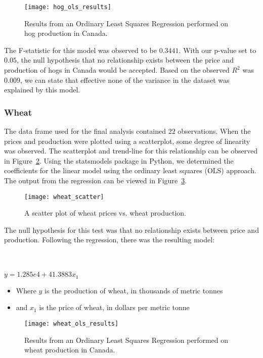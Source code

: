 \begin{figure}
    \texttt{[image: hog\_ols\_results]}
    \caption{Results from an Ordinary Least Squares Regression performed on hog production in Canada.}
    \label{fig:hog_ols}
\end{figure}


The F-statistic for this model was observed to be $0.3441$.
With our p-value set to $0.05$, the null hypothesis that no relationship exists between the price and production of hogs in Canada would be accepted.
Based on the observed $R^2$ was $0.009$, we can state that effective none of the variance in the dataset was explained by this model.

\subsubsection{Wheat}

The data frame used for the final analysis contained 22 observations.
When the prices and production were plotted using a scatterplot, some degree of linearity was observed.
The scatterplot and trend-line for this relationship can be observed in Figure~\ref{fig:wheat_scatter}.
Using the statsmodels package in Python, we determined the coefficients for the linear model using the ordinary least squares (OLS) approach.
The output from the regression can be viewed in Figure~\ref{fig:wheat_ols}.

\begin{figure}
    \texttt{[image: wheat\_scatter]}
    \caption{A scatter plot of wheat prices vs. wheat production.}
    \label{fig:wheat_scatter}
\end{figure}

The null hypothesis for this test was that no relationship exists between price and production.
Following the regression, there was the resulting model:

\\~\\

\tabto{5cm} $y = 1.285e4 + 41.3883x_1$

\begin{itemize}
    \item Where $y$ is the production of wheat, in thousands of metric tonnes
    \item and $x_1$ is the price of wheat, in dollars per metric tonne
\end{itemize}

\begin{figure}
    \texttt{[image: wheat\_ols\_results]}
    \caption{Results from an Ordinary Least Squares Regression performed on wheat production in Canada.}
    \label{fig:wheat_ols}
\end{figure}

